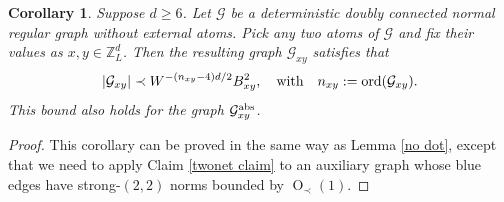 \documentclass{article}
\newcommand{\1}{\mathds{1}}
\numberwithin{equation}{section}
\newcommand{\ord}{{\rm{ord}}}
\newcommand{\al}{\alpha}
\newcommand{\be}{\begin{equation}}
\newcommand{\ee}{\end{equation}}
\newcommand{\e}{{\varepsilon}}
\renewcommand{\cal}{\mathcal}
\renewcommand{\geq}{\geqslant}
\renewcommand{\ge}{\geq}
\newcommand{\Z}{\mathbb{Z}}
\DeclareMathOperator{\OO}{O}
\theoremstyle{plain} %
\newtheorem{corollary}[theorem]{Corollary}
\theoremstyle{remark}
\begin{document}
\begin{corollary}\label{lem Rdouble}
Suppose $d\ge 6$. Let $\cal G$ be a deterministic doubly connected normal regular graph without external atoms. Pick any two atoms of $\cal G$ and fix their values as $x , y\in \Z_L^d$. Then the resulting graph $\cal G_{xy}$ satisfies that %
\be\label{bound 2net1B}
\left|\cal G_{xy}\right| \prec W^{ - \left(n_{xy} -4\right) d/2} B_{xy}^2 ,\quad \text{with}\quad n_{xy}:=\ord(\cal G_{xy}).
\ee
This bound also holds for the graph $ {\cal G}^{{\rm abs}}_{xy}$. %
\end{corollary}
\begin{proof} 
This corollary can be proved in the same way as Lemma \ref{no dot}, except that we need to apply Claim \ref{twonet claim} to an auxiliary graph whose blue edges have strong-$(2,2)$ norms bounded by $\OO_\prec(1)$. %
\end{proof}
\end{document}
